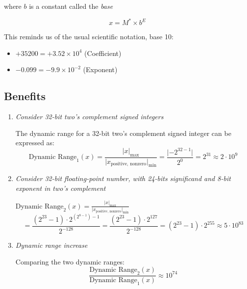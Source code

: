 \documentclass[12pt,openany, tikz,border=10pt]{book}
\begin{document}
where \( b \) is a constant called the \textit{base}

\[ x = M^* \times b^E \]

This reminds us of the usual scientific notation, base 10:
\begin{itemize}
  \item[] \( +35200 = +3.52 \times 10^4 \) (Coefficient)
  \item[] \( -0.099 = -9.9 \times 10^{-2} \) (Exponent)
\end{itemize}

\subsection{Benefits }
\begin{enumerate}
    \item \textit{Consider 32-bit two's complement signed integers}
    
    The dynamic range for a 32-bit two's complement signed integer can be expressed as:
    \begin{equation*}
    \text{Dynamic Range}_1 (x) = \frac{\lvert x \rvert_{\text{max}}}{\lvert x_{\text{positive, nonzero}} \rvert_{\text{min}}} = \frac{\lvert -2^{32-1} \rvert}{2^0} = 2^{31} \approx 2 \cdot 10^9
    \end{equation*}
    
    \item \textit{Consider 32-bit floating-point number, with 24-bits significand and 8-bit exponent in two's complement}
       
   {$\text{Dynamic Range}_2 (x) = \frac{\lvert x \rvert_{\text{max}}}{\lvert x_{\text{positive, nonzero}} \rvert_{\text{min}}}$ $$= \frac{(2^{23} - 1) \cdot 2^{(2^{8-1}) - 1}}{2^{-128}} = \frac{(2^{23} - 1) \cdot 2^{127}}{2^{-128}} = (2^{23} - 1) \cdot 2^{255} \approx 5 \cdot 10^{83}$$}

    
    \item \textit{Dynamic range increase}
    
    Comparing the two dynamic ranges:
    \begin{equation*}
    \frac{\text{Dynamic Range}_2 (x)}{\text{Dynamic Range}_1 (x)} \approx 10^{74}
    \end{equation*}
\end{enumerate}
\newpage
\end{document}
